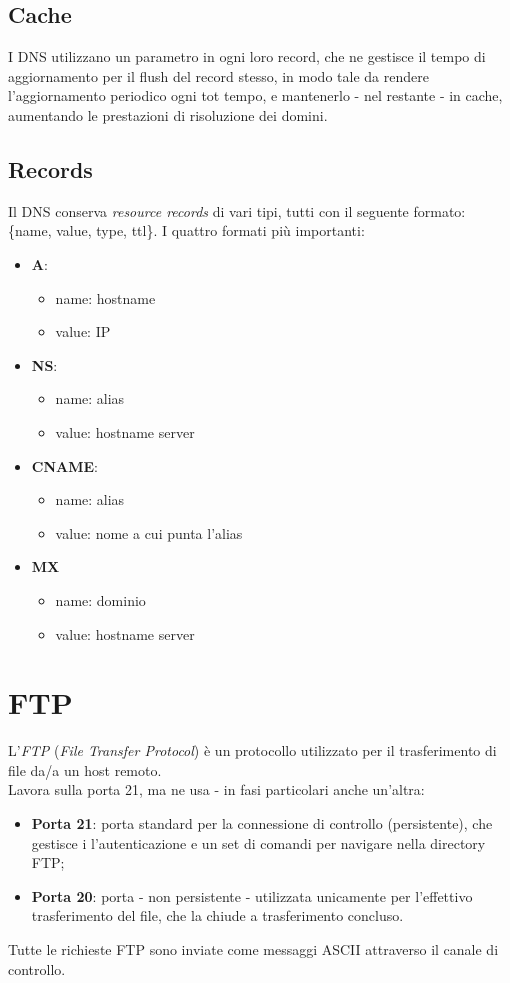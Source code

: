 \subsection{Cache}
I DNS utilizzano un parametro in ogni loro record, che ne gestisce il tempo di aggiornamento per il flush del record stesso, in modo tale da rendere l'aggiornamento periodico ogni tot tempo, e mantenerlo - nel restante - in cache, aumentando le prestazioni di risoluzione dei domini.
\newpage

\subsection{Records}
Il DNS conserva \textit{resource records} di vari tipi, tutti con il seguente formato: \{name, value, type, ttl\}.
I quattro formati più importanti:
\begin{itemize}
	\item \textbf{A}: 
	\begin{itemize}
		\item name: hostname
		\item value: IP
	\end{itemize}
	\item \textbf{NS}: 
	\begin{itemize}
		\item name: alias
		\item value: hostname server
	\end{itemize}
	\item \textbf{CNAME}:
	\begin{itemize}
		\item name: alias
		\item value: nome a cui punta l'alias
	\end{itemize}
	\item \textbf{MX}
	\begin{itemize}
		\item name: dominio
		\item value: hostname server
	\end{itemize}
\end{itemize}

\section{FTP}
L'\textit{FTP} (\textit{File Transfer Protocol}) è un protocollo utilizzato per il trasferimento di file da/a un host remoto. \\
Lavora sulla porta 21, ma ne usa - in fasi particolari anche un'altra:
\begin{itemize}
    \item \textbf{Porta 21}: porta standard per la connessione di controllo (persistente), che gestisce i l'autenticazione e un set di comandi per navigare nella directory FTP;
    \item \textbf{Porta 20}: porta - non persistente - utilizzata unicamente per l'effettivo trasferimento del file, che la chiude a trasferimento concluso.
\end{itemize}
Tutte le richieste FTP sono inviate come messaggi ASCII attraverso il canale di controllo.

